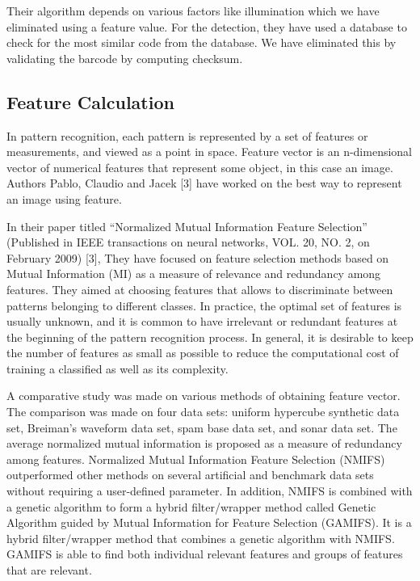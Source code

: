 \documentclass[times, 1pt, a4paper]{article}
\begin{document}
Their algorithm depends on various factors like illumination which we have eliminated using a feature value. For the detection, they have used a database to check for the most similar code from the database. We have eliminated this by validating the barcode by computing checksum.

\subsection{Feature Calculation} \label{subsection:feature_calculation}

In pattern recognition, each pattern is represented by a set of features or measurements, and viewed as a point in space. Feature vector is an n-dimensional vector of numerical features that represent some object, in this case an image.  Authors Pablo, Claudio and Jacek [3] have worked on the best way to represent an image using feature. 

In their paper titled “Normalized Mutual Information Feature Selection” (Published in IEEE transactions on neural networks, VOL. 20, NO. 2, on February 2009) [3], They have focused on feature selection methods based on Mutual Information (MI) as a measure of relevance and redundancy among features. They aimed at choosing features that allows to discriminate between patterns belonging to different classes. In practice, the optimal set of features is usually unknown, and it is common to have irrelevant or redundant features at the beginning of the pattern recognition process. In general, it is desirable to keep the number of features as small as possible to reduce the computational cost of training a classified as well as its complexity. 

A comparative study was made on various methods of obtaining feature vector. The comparison was made on four data sets: uniform hypercube synthetic data set, Breiman’s waveform data set, spam base data set, and sonar data set. The average normalized mutual information is proposed as a measure of redundancy among features. Normalized Mutual Information Feature Selection (NMIFS) outperformed other methods on several artificial and benchmark data sets without requiring a user-defined parameter. In addition, NMIFS is combined with a genetic algorithm to form a hybrid filter/wrapper method called Genetic Algorithm guided by Mutual Information for Feature Selection (GAMIFS). It is a hybrid filter/wrapper method that combines a genetic algorithm with NMIFS. GAMIFS is able to find both individual relevant features and groups of features that are relevant.
\end{document}
